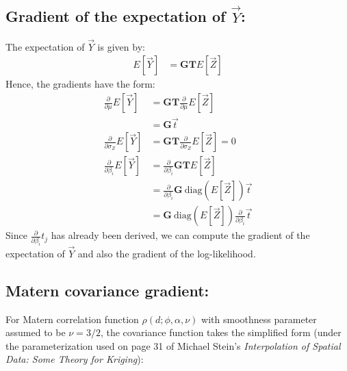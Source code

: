 {\subsection*{Gradient of the expectation of $\vec{Y}$:}
The expectation of $\vec{Y}$ is given by:
\begin{align*}
E[\vec{Y}] &= \mathbf{G T} E[\vec{Z}] 
\end{align*}
Hence, the gradients have the form:
\begin{align*}
\frac{\partial}{\partial \mu} E[\vec{Y}] &= \mathbf{GT} \frac{\partial}{\partial \mu} E[\vec{Z}] \\
&= \mathbf{G} \vec{t} \\
\frac{\partial}{\partial \sigma_{Z}} E[\vec{Y}] &= \mathbf{GT} \frac{\partial}{\partial \sigma_{Z}} E[\vec{Z}] = 0 \\
\frac{\partial}{\partial \beta_i} E[\vec{Y}] &= \frac{\partial}{\partial \beta_i} \mathbf{G T} E[\vec{Z}] \\
&= \frac{\partial}{\partial \beta_i} \mathbf{G} \ \text{diag}(E[\vec{Z}]) \vec{t} \\
&= \mathbf{G} \ \text{diag}(E[\vec{Z}]) \frac{\partial}{\partial \beta_i} \vec{t}
\end{align*}
Since $\frac{\partial}{\partial \beta_i} t_j$ has already been derived, we can compute the gradient of the expectation of $\vec{Y}$ and also the gradient of the log-likelihood.

\subsection*{Matern covariance gradient:}

For Matern correlation function $\rho(d; \phi, \alpha , \nu)$ with smoothness parameter assumed to be $\nu = 3/2$, the covariance function takes the simplified form (under the parameterization used on page 31 of Michael Stein's \textit{Interpolation of Spatial Data: Some Theory for Kriging}):

}
